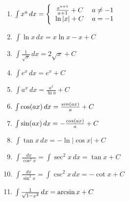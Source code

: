 \begin{center}
    \begin{small}
        \begin{enumerate}
            \item \begin{math}
                \int x^a\,dx =
                \Bigg\{\begin{tabular}{ccc}
                    $\frac{x^{a+1}}{a+1} + C$  & $a \neq -1$ & \\
                    $ \ln{\left|x\right|} + C$ & $a = -1$ & \\
                  \end{tabular}
            \end{math}
            \item \begin{math}
                \int \ln {x}\,dx = x \ln {x} - x + C
            \end{math}
            \item \begin{math}
                \int \frac {1}{\sqrt{x}}\,dx=2\sqrt{x} + C 
            \end{math}
            \item \begin{math}
                \int e^x\,dx = e^x + C
            \end{math}
            \item \begin{math}
                \int a^x\,dx = \frac{a^x}{\ln{a}} + C
            \end{math}
            \item \begin{math}
                \int \cos({ax}) \, dx = {sin (ax) \over a} + C
            \end{math}
            \item \begin{math}
                \int \sin({ax}) \, dx = {-{cos(ax) \over a}} + C
            \end{math}
            \item \begin{math}
                \int \tan{x} \, dx = -\ln{\left| \cos {x} \right|} + C
            \end{math}
            \item \begin{math}
                \int \frac{dx}{\cos^2 x}=\int \sec^2 x \, dx = \tan x + C
            \end{math}
            \item \begin{math}
                \int \frac{dx}{\sin^2 x}=\int \csc^2 x \, dx = -\cot x + C
            \end{math}
            \item \begin{math}
                \int {1 \over \sqrt{1-x^2}} \, dx = \arcsin {x} + C
            \end{math}
        \end{enumerate}
    \end{small}
\end{center}
